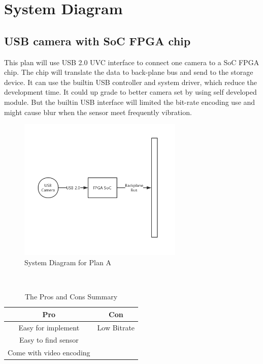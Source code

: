 \documentclass[12pt,article]{memoir}
\begin{document}
\chapter{System Diagram}
\section{USB camera with SoC FPGA chip}
This plan will use USB 2.0 UVC interface to connect one camera to a SoC FPGA chip. The chip will translate the data to back-plane bus and send to the storage device. It can use the builtin USB controller and system driver, which reduce the development time. It could up grade to better camera set by using self developed module. But the builtin USB interface will limited the bit-rate encoding use and might cause blur when the sensor meet frequently vibration.\\
\begin{figure}[htp]
\begin{center}
\includegraphics[width=0.7\textwidth]{img/DR00002_Plan1.png}
 \caption{System Diagram for Plan A}	
\end{center}
\end{figure}
\\
\begin{table}[H]
	\centering
		\begin{tabu}{c | c }
		Pro & Con \\ \hline
		Easy for implement & Low Bitrate \\
		Easy to find sensor &  \\
		Come with video encoding &  \\
		\end{tabu}
	\caption{The Pros and Cons Summary}
\end{table}
\newpage
\end{document}
